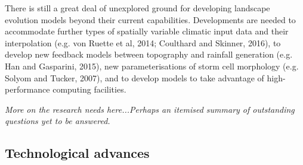 \documentclass[12pt,oneside,PhD]{muthesis}
\begin{document}
There is still a great deal of unexplored ground for developing landscape evolution models beyond their current capabilities.  Developments are needed to accommodate further types of spatially variable climatic input data and their interpolation (e.g. von Ruette et al, 2014; Coulthard and Skinner, 2016), to develop new feedback models between topography and rainfall generation (e.g. Han and Gasparini, 2015), new parameterisations of storm cell morphology (e.g. Solyom and Tucker, 2007), and to develop models to take advantage of high-performance computing facilities. %

\textit{More on the research needs here...Perhaps an itemised summary of outstanding questions yet to be answered.}

\subsection{Technological advances}
\end{document}
